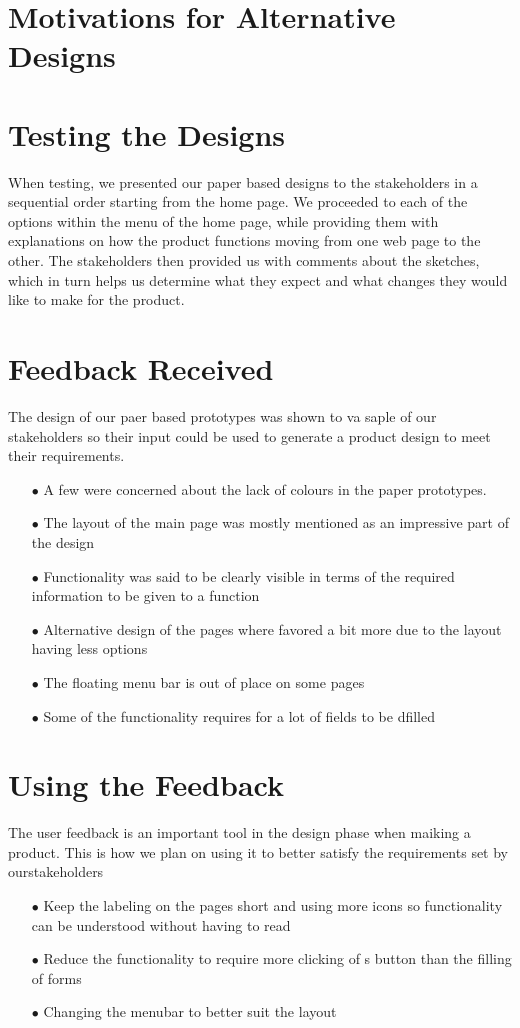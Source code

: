 \documentclass[11pt]{article}
\begin{document}
\newpage

\section{Motivations for Alternative Designs}

\section{Testing the Designs}
	When testing, we presented our paper based designs to the stakeholders in a sequential order starting from the home page. We proceeded to each of the options within the menu of the home page, while providing them with explanations on how the product functions moving from one web page to the other. The stakeholders then provided us with comments about the sketches, which in turn helps us determine what they expect and what changes they would like to make for the product.

\section{Feedback Received}
	The design of our paer based prototypes was shown to va saple of our stakeholders so their input could be used to generate a product design to meet their requirements.
	\begin{itemize}
		\item[$\bullet$] A few were concerned about the lack of colours in the paper prototypes.
		\item[$\bullet$] The layout of the main page was mostly mentioned as an impressive part of the design
		\item[$\bullet$] Functionality was said to be clearly visible in terms of the required information to be given to a function
		\item[$\bullet$] Alternative design of the pages where favored a bit more due to the layout having less options
		\item[$\bullet$] The floating menu bar is out of place on some pages
		\item[$\bullet$]  Some of the functionality requires for a lot of fields to be dfilled
	\end{itemize}
\section{Using the Feedback}
	The user feedback is an important tool in the design phase when maiking a product. This is how we plan on using it to better satisfy the requirements set by ourstakeholders
	\begin{itemize}
		\item[$\bullet$] Keep the labeling on the pages short and using more icons so functionality can be understood without having to read	
		\item[$\bullet$] Reduce the functionality to require more clicking of s button than the filling of forms
		\item[$\bullet$] Changing the menubar to better suit the layout
	\end{itemize}
\end{document}
